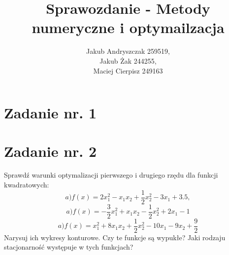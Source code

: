 \documentclass{article}
\begin{document}
\title{Sprawozdanie - Metody numeryczne i optymailzacja}
\author{Jakub Andryszczak 259519,\\ Jakub Żak 244255,\\ Maciej Cierpisz 249163}
\date{}
\maketitle

\newpage
\tableofcontents

\newpage
\section{Zadanie nr. 1}

\section{Zadanie nr. 2}
Sprawdź warunki optymalizacji pierwszego i drugiego rzędu dla funkcji kwadratowych:
\begin{equation}
  a) f(x) = 2x^2_1 - x_1x_2 + \frac{1}{2}x^2_2 - 3x_1 + 3.5,
\end{equation}
\begin{equation}
  a) f(x) = -\frac{3}{2}x^2_1+x_1x_2-\frac{1}{2}x^2_2 +2x_1 - 1
\end{equation}
\begin{equation}
  a) f(x) = x^2_1 + 8x_1x_2 + \frac{1}{2} x^2_2 - 10x_1 - 9x_2 + \frac{9}{2}
\end{equation}
Narysuj ich wykresy konturowe. Czy te funkcje są wypukłe? Jaki rodzaju stacjonarność
występuje w tych funkcjach?\newline
\end{document}
